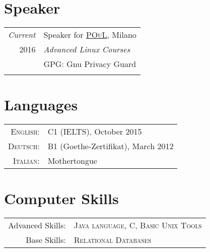 \documentclass[a4paper,10pt]{article} %
\begin{document}

\section{Speaker}

\begin{tabular}{r|p{11cm}}
\emph{Current} & Speaker for \href{https://poul.org}{\textsc{POuL}}, Milano \\
\textsc{ 2016} & \emph{Advanced Linux Courses}\\
& \footnotesize{GPG: Gnu Privacy Guard}\\
\multicolumn{2}{c}{} \\

\end{tabular}

\section{Languages}

\begin{tabular}{rl}
\textsc{English:} & C1 (IELTS), October 2015\\

\textsc{Deutsch:} & B1 (Goethe-Zertifikat), March 2012\\

\textsc{Italian:} & Mothertongue\\

\end{tabular}



\section{Computer Skills}

\begin{tabular}{rl}
Advanced Skills: & \textsc{Java language}, \textsc{C}, \textsc{Basic Unix Tools}\\

Base Skills: & \setmainfont[SmallCapsFont=Fontin SmallCaps]{Fontin-Regular} \textsc{Relational Databases}\\
\end{tabular}
\end{document}
